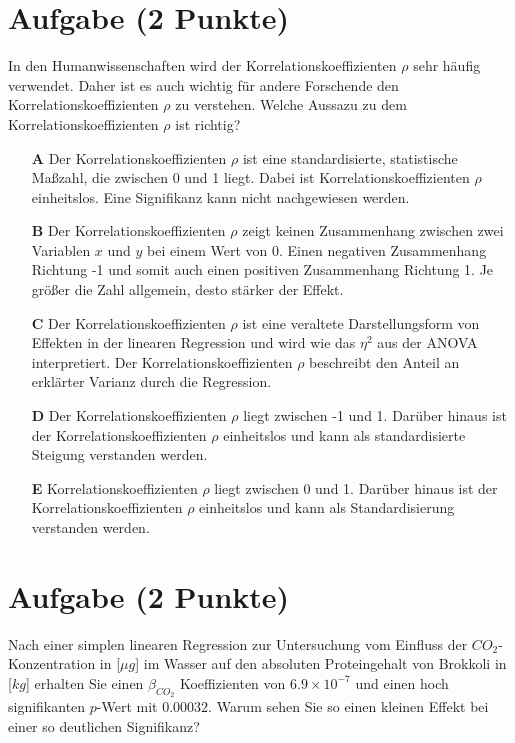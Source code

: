 \documentclass[a4paper, 9pt]{scrartcl}\usepackage[]{graphicx}\usepackage[]{xcolor}
\begin{document}
\section{Aufgabe \hfill (2 Punkte)}




In den Humanwissenschaften wird der Korrelationskoeffizienten $\rho$ sehr häufig verwendet. Daher ist es auch wichtig für andere Forschende den Korrelationskoeffizienten $\rho$ zu verstehen. Welche Aussazu zu dem Korrelationskoeffizienten $\rho$ ist richtig?




\begin{enumerate}
\item [\textbf{A} \msquare] Der Korrelationskoeffizienten $\rho$ ist eine standardisierte, statistische Maßzahl, die zwischen 0 und 1 liegt. Dabei ist Korrelationskoeffizienten $\rho$ einheitslos. Eine Signifikanz kann nicht nachgewiesen werden.
\item [\textbf{B} \msquare] Der Korrelationskoeffizienten $\rho$ zeigt keinen Zusammenhang zwischen zwei Variablen $x$ und $y$ bei einem Wert von 0. Einen negativen Zusammenhang Richtung -1 und somit auch einen positiven Zusammenhang Richtung 1. Je größer die Zahl allgemein, desto stärker der Effekt.
\item [\textbf{C} \msquare] Der Korrelationskoeffizienten $\rho$ ist eine veraltete Darstellungsform von Effekten in der linearen Regression und wird wie das $\eta^2$ aus der ANOVA interpretiert. Der Korrelationskoeffizienten $\rho$ beschreibt den Anteil an erklärter Varianz durch die Regression.
\item [\textbf{D} \msquare] Der Korrelationskoeffizienten $\rho$ liegt zwischen -1 und 1. Darüber hinaus ist der Korrelationskoeffizienten $\rho$ einheitslos und kann als standardisierte Steigung verstanden werden.
\item [\textbf{E} \msquare] Korrelationskoeffizienten $\rho$ liegt zwischen 0 und 1. Darüber hinaus ist der Korrelationskoeffizienten $\rho$ einheitslos und kann als Standardisierung verstanden werden.
\end{enumerate}

\section{Aufgabe \hfill (2 Punkte)}



Nach einer simplen linearen Regression zur Untersuchung vom Einfluss der $CO_2$-Konzentration in [$\mu g$] im Wasser auf den absoluten Proteingehalt von Brokkoli in [$kg$] erhalten Sie einen $\beta_{CO_2}$ Koeffizienten von $6.9\times 10^{-7}$ und einen hoch signifikanten $p$-Wert mit $0.00032$. Warum sehen Sie so einen kleinen Effekt bei einer so deutlichen Signifikanz?
\end{document}
